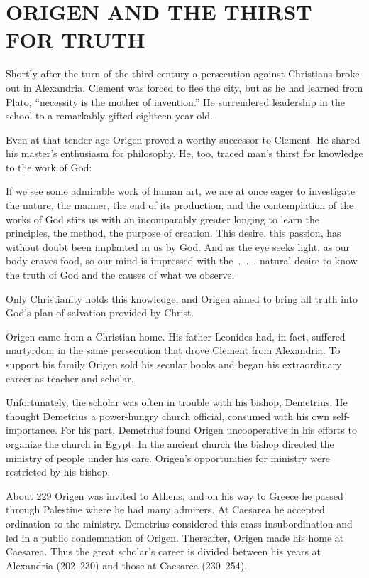 \section{ORIGEN AND THE THIRST FOR TRUTH}

Shortly after the turn of the third century a persecution against Christians broke out in
Alexandria. Clement was forced to flee the city, but as he had learned from Plato, “necessity is the
mother of invention.” He surrendered leadership in the school to a remarkably gifted
eighteen-year-old.

Even at that tender age Origen proved a worthy successor to Clement. He shared his master’s
enthusiasm for philosophy. He, too, traced man’s thirst for knowledge to the work of God:

\begin{blockquote}
If we see some admirable work of human art, we are at once eager to investigate the nature, the
manner, the end of its production; and the contemplation of the works of God stirs us with an
incomparably greater longing to learn the principles, the method, the purpose of creation. This
desire, this passion, has without doubt been implanted in us by God. And as the eye seeks light, as
our body craves food, so our mind is impressed with the~.~.~. natural desire to know the truth of
God and the causes of what we observe.
\end{blockquote}


Only Christianity holds this knowledge, and Origen aimed to bring all truth into God’s plan of
salvation provided by Christ.

Origen came from a Christian home. His father Leonides had, in fact, suffered martyrdom in the same
persecution that drove Clement from Alexandria. To support his family Origen sold his secular books
and began his extraordinary career as teacher and scholar.

Unfortunately, the scholar was often in trouble with his bishop, Demetrius. He thought Demetrius a
power-hungry church official, consumed with his own self-importance. For his part, Demetrius found
Origen uncooperative in his efforts to organize the church in Egypt. In the ancient church the
bishop directed the ministry of people under his care. Origen’s opportunities for ministry were
restricted by his bishop.

About 229 Origen was invited to Athens, and on his way to Greece he passed through Palestine where
he had many admirers. At Caesarea he accepted ordination to the ministry. Demetrius considered this
crass insubordination and led in a public condemnation of Origen. Thereafter, Origen made his home
at Caesarea. Thus the great scholar’s career is divided between his years at Alexandria (202–230)
and those at Caesarea (230–254).

